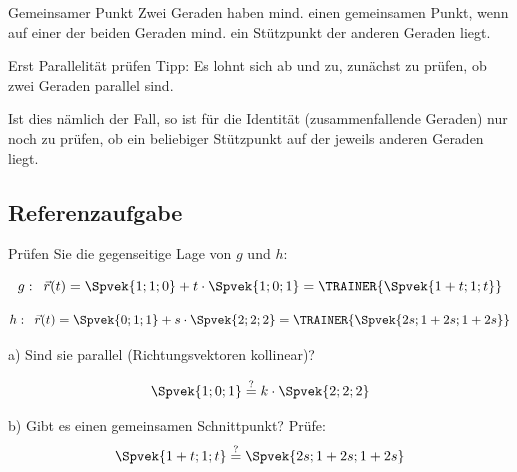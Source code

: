 \begin{bemerkung}{Gemeinsamer Punkt}{}
  Zwei Geraden haben mind. einen gemeinsamen Punkt, wenn auf einer der
  beiden Geraden mind. ein Stützpunkt der anderen Geraden liegt.  
\end{bemerkung}

\begin{bemerkung}{Erst Parallelität prüfen}{}
Tipp: Es lohnt sich ab und zu, zunächst zu prüfen, ob zwei Geraden parallel
sind.

Ist dies nämlich der Fall, so ist für die Identität (zusammenfallende
Geraden) nur noch zu prüfen, ob ein beliebiger Stützpunkt auf der
jeweils anderen Geraden liegt.
\end{bemerkung}

\newpage
\subsection{Referenzaufgabe}
Prüfen Sie die gegenseitige Lage von $g$ und $h$:

$$g:\,\,\, \vec{r}(t) = \Spvek{1;1;0} + t\cdot{} \Spvek{1;0;1} = \TRAINER{\Spvek{1+t;1;t}}$$

$$h:\,\,\, \vec{r}(t) = \Spvek{0;1;1} + s\cdot{} \Spvek{2;2;2} = \TRAINER{\Spvek{2s;1+2s;1+2s}}$$

a) Sind sie parallel (Richtungsvektoren kollinear)?

$$\Spvek{1;0;1} \stackrel{?}{=} k\cdot{} \Spvek{2;2;2}$$

b) Gibt es einen gemeinsamen Schnittpunkt?
Prüfe:
$$\Spvek{1+t;1;t} \stackrel{?}{=} \Spvek{2s;1+2s;1+2s} $$






\newpage

